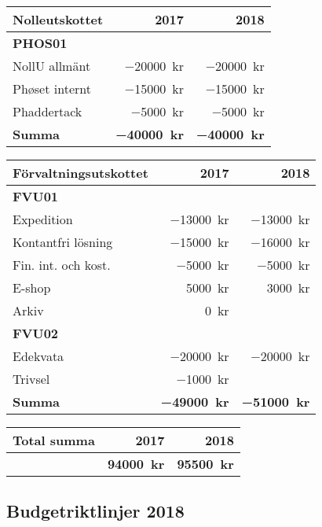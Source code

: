 \documentclass[../_main/handlingar.tex]{subfiles}
\begin{document}
\begin{tabularx}{10cm}{X r r}
    \textbf{\large Nolleutskottet} & \textbf{2017} & \textbf{2018} \\
    \hline
    \textbf{PHOS01} \\
    NollU allmänt & \SI{-20000}{kr} & \SI{-20000}{kr} \\
    Ph{\o}set internt & \SI{-15000}{kr} & \SI{-15000}{kr} \\
    Phaddertack & \SI{-5000}{kr} & \SI{-5000}{kr} \\
    \hline
    \textbf{Summa} & \textbf{\SI{-40000}{kr}} & \textbf{\SI{-40000}{kr}} \\
\end{tabularx}

\begin{tabularx}{9cm}{X r r}
    \textbf{\large Förvaltningsutskottet} & \textbf{2017} & \textbf{2018} \\
    \hline
    \textbf{FVU01} \\
    Expedition & \SI{-13000}{kr} & \SI{-13000}{kr} \\
    Kontantfri lösning & \SI{-15000}{kr} & \SI{-16000}{kr} \\
    Fin. int. och kost. & \SI{-5000}{kr} & \SI{-5000}{kr} \\
    E-shop & \SI{5000}{kr} & \SI{3000}{kr} \\
    Arkiv & \SI{0}{kr} & \\
    \textbf{FVU02} \\
    Edekvata & \SI{-20000}{kr} & \SI{-20000}{kr} \\
    Trivsel & \SI{-1000}{kr} & \\
    \hline
    \textbf{Summa} & \textbf{\SI{-49000}{kr}} & \textbf{\SI{-51000}{kr}} \\
\end{tabularx}

\begin{tabularx}{9cm}{X r r}
    \textbf{\large Total summa} & \textbf{2017} & \textbf{2018} \\
    \hline
     & \textbf{\SI{94000}{kr}} & \textbf{\SI{95500}{kr}} \\
\end{tabularx}


\newpage
\subsection*{Budgetriktlinjer 2018}
\end{document}
